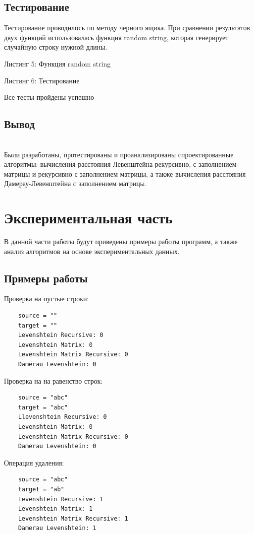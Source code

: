 \documentclass[12pt,a4paper]{article}
\begin{document}
\subsection{Тестирование}
Тестирование проводилось по методу черного ящика.
При сравнении результатов двух функций использовалась функция random string, которая генерирует случайную строку нужной длины.
\begin{center}
	Листинг 5: Функция random string
	
\end{center}
Листинг 6: Тестирование
	
Все тесты пройдены успешно
\subsection{Вывод}\\
Были разработаны, протестированы и проанализированы спроектированные алгоритмы: вычисления расстояния Левенштейна рекурсивно, с заполнением матрицы и рекурсивно с заполнением матрицы, а также вычисления расстояния Дамерау-Левенштейна с заполнением матрицы.
\clearpage

\section{Экспериментальная часть}
В данной части работы будут приведены примеры работы программ, а также анализ алгоритмов на основе экспериментальных данных.
\subsection{Примеры работы}
Проверка на пустые строки:
\begin{lstlisting}
	source = ""
	target = ""
	Levenshtein Recursive: 0
	Levenshtein Matrix: 0
	Levenshtein Matrix Recursive: 0
	Damerau Levenshtein: 0
\end{lstlisting}
Проверка на на равенство строк:
\begin{lstlisting}
	source = "abc"
	target = "abc"
	Llevenshtein Recursive: 0
	Levenshtein Matrix: 0
	Levenshtein Matrix Recursive: 0
	Damerau Levenshtein: 0
\end{lstlisting}

Операция удаления:
\begin{lstlisting}
	source = "abc"
	target = "ab"
	Levenshtein Recursive: 1
	Levenshtein Matrix: 1
	Levenshtein Matrix Recursive: 1
	Damerau Levenshtein: 1
\end{lstlisting}
\end{document}
